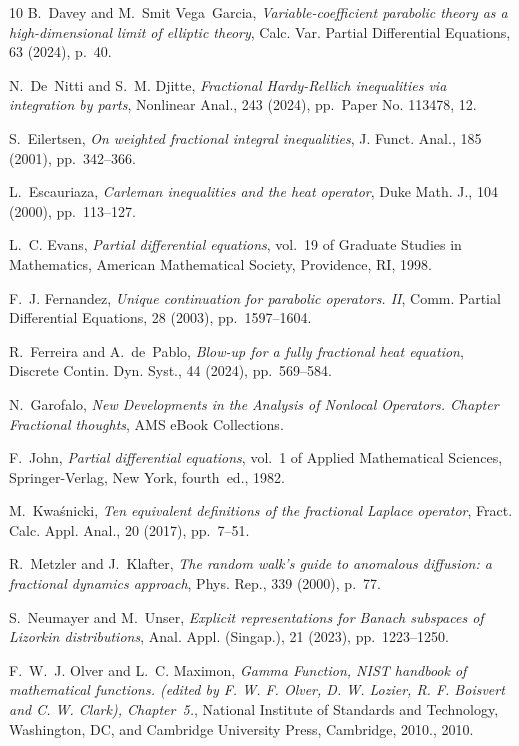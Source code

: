 \documentclass[11pt, twoside, notitlepage]{amsart}
\numberwithin{equation}{section}
\begin{document}
\begin{thebibliography}{10}
{\sc B.~Davey and M.~Smit Vega~Garcia}, {\em Variable-coefficient parabolic
  theory as a high-dimensional limit of elliptic theory}, Calc. Var. Partial
  Differential Equations, 63 (2024), p.~40.

{\sc N.~De~Nitti and S.~M. Djitte}, {\em Fractional {H}ardy-{R}ellich
  inequalities via integration by parts}, Nonlinear Anal., 243 (2024),
  pp.~Paper No. 113478, 12.

{\sc S.~Eilertsen}, {\em On weighted fractional integral inequalities}, J.
  Funct. Anal., 185 (2001), pp.~342--366.

{\sc L.~Escauriaza}, {\em Carleman inequalities and the heat operator}, Duke
  Math. J., 104 (2000), pp.~113--127.

{\sc L.~C. Evans}, {\em Partial differential equations}, vol.~19 of Graduate
  Studies in Mathematics, American Mathematical Society, Providence, RI, 1998.

{\sc F.~J. Fernandez}, {\em Unique continuation for parabolic operators. {II}},
  Comm. Partial Differential Equations, 28 (2003), pp.~1597--1604.

{\sc R.~Ferreira and A.~de~Pablo}, {\em Blow-up for a fully fractional heat
  equation}, Discrete Contin. Dyn. Syst., 44 (2024), pp.~569--584.

{\sc N.~Garofalo}, {\em New Developments in the Analysis of Nonlocal Operators.
  Chapter Fractional thoughts}, AMS eBook Collections.

{\sc F.~John}, {\em Partial differential equations}, vol.~1 of Applied
  Mathematical Sciences, Springer-Verlag, New York, fourth~ed., 1982.

{\sc M.~Kwa\'snicki}, {\em Ten equivalent definitions of the fractional
  {L}aplace operator}, Fract. Calc. Appl. Anal., 20 (2017), pp.~7--51.

{\sc R.~Metzler and J.~Klafter}, {\em The random walk's guide to anomalous
  diffusion: a fractional dynamics approach}, Phys. Rep., 339 (2000), p.~77.

{\sc S.~Neumayer and M.~Unser}, {\em Explicit representations for {B}anach
  subspaces of {L}izorkin distributions}, Anal. Appl. (Singap.), 21 (2023),
  pp.~1223--1250.

{\sc F.~W.~J. Olver and L.~C. Maximon}, {\em Gamma Function, NIST handbook of
  mathematical functions. (edited by F. W. F. Olver, D. W. Lozier, R. F.
  Boisvert and C. W. Clark), Chapter~5.}, National Institute of Standards and
  Technology, Washington, DC, and Cambridge University Press, Cambridge, 2010.,
  2010.


\end{thebibliography}
\end{document}
